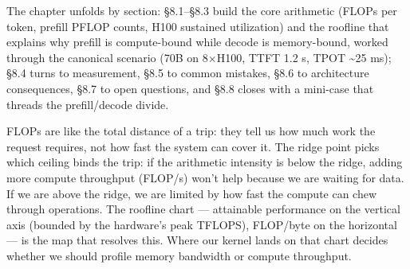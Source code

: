 The chapter unfolds by section: §8.1--§8.3 build the core arithmetic
(FLOPs per token, prefill PFLOP counts, H100 sustained utilization) and
the roofline that explains why prefill is compute-bound while decode is
memory-bound, worked through the canonical scenario (70B on 8×H100, TTFT
1.2 s, TPOT \textasciitilde25 ms); §8.4 turns to measurement, §8.5 to
common mistakes, §8.6 to architecture consequences, §8.7 to open
questions, and §8.8 closes with a mini-case that threads the
prefill/decode divide.

\label{mental-model}


FLOPs are like the total distance of a trip: they tell us how much work
the request requires, not how fast the system can cover it. The ridge
point picks which ceiling binds the trip: if the arithmetic intensity is
below the ridge, adding more compute throughput (FLOP/s) won't help
because we are waiting for data. If we are above the ridge, we are
limited by how fast the compute can chew through operations. The
roofline chart --- attainable performance on the vertical axis (bounded
by the hardware's peak TFLOPS), FLOP/byte on the horizontal --- is the
map that resolves this. Where our kernel lands on that chart decides
whether we should profile memory bandwidth or compute throughput.


